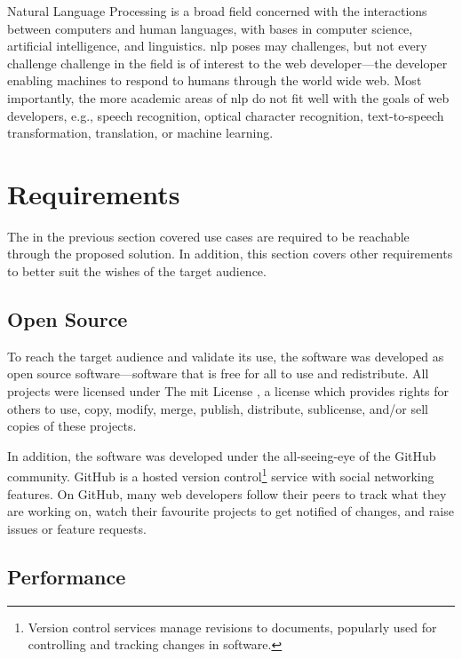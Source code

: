 Natural Language Processing is a broad field concerned with the
interactions between computers and human languages, with bases in
computer science, artificial intelligence, and linguistics. \gls{nlp}
poses may challenges, but not every challenge challenge in the field is
of interest to the web developer---the developer enabling machines to
respond to humans through the world wide web. Most importantly, the more
academic areas of \gls{nlp} do not fit well with the goals of web
developers, e.g., speech recognition, optical character recognition,
text-to-speech transformation, translation, or machine learning.

\section{Requirements}\label{requirements}

The in the previous section covered use cases are required to be
reachable through the proposed solution. In addition, this section
covers other requirements to better suit the wishes of the target
audience.

\subsection{Open Source}\label{open-source}

To reach the target audience and validate its use, the software was
developed as open source software---software that is free for all to use
and redistribute. All projects were licensed under The \acrshort{mit}
License \autocite{opensource.org-licenses-mit}, a license which provides
rights for others to use, copy, modify, merge, publish, distribute,
sublicense, and\slash or sell copies of these projects.

In addition, the software was developed under the all-seeing-eye of the
GitHub community. GitHub is a hosted version control\footnote{Version
  control services manage revisions to documents, popularly used for
  controlling and tracking changes in software.} service with social
networking features. On GitHub, many web developers follow their peers
to track what they are working on, watch their favourite projects to get
notified of changes, and raise issues or feature requests.

\subsection{Performance}\label{performance}

